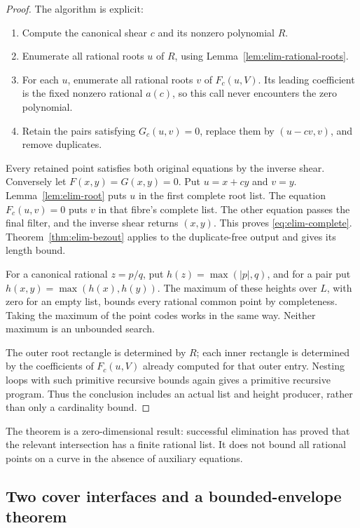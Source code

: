 \begin{proof}
The algorithm is explicit:
\begin{enumerate}
\item Compute the canonical shear \(c\) and its nonzero polynomial \(R\).
\item Enumerate all rational roots \(u\) of \(R\), using
Lemma~\ref{lem:elim-rational-roots}.
\item For each \(u\), enumerate all rational roots \(v\) of
\(F_c(u,V)\).  Its leading coefficient is the fixed nonzero rational
\(a(c)\), so this call never encounters the zero polynomial.
\item Retain the pairs satisfying \(G_c(u,v)=0\), replace them by
\((u-cv,v)\), and remove duplicates.
\end{enumerate}
Every retained point satisfies both original equations by the inverse
shear.  Conversely let \(F(x,y)=G(x,y)=0\).  Put \(u=x+cy\) and
\(v=y\).  Lemma~\ref{lem:elim-root} puts \(u\) in the first complete
root list.  The equation \(F_c(u,v)=0\) puts \(v\) in that fibre's
complete list.  The other equation passes the final filter, and the
inverse shear returns \((x,y)\).  This proves
\eqref{eq:elim-complete}.  Theorem~\ref{thm:elim-bezout} applies to the
duplicate-free output and gives its length bound.

For a canonical rational \(z=p/q\), put \(h(z)=\max(|p|,q)\), and
for a pair put \(h(x,y)=\max(h(x),h(y))\).  The maximum of these heights
over \(L\), with zero for an empty list, bounds every rational common
point by completeness.  Taking the maximum of the point codes works in
the same way.  Neither maximum is an unbounded search.

The outer root rectangle is determined by \(R\); each inner rectangle
is determined by the coefficients of \(F_c(u,V)\) already computed for
that outer entry.  Nesting loops with such primitive recursive bounds
again gives a primitive recursive program.  Thus the conclusion includes
an actual list and height producer, rather than only a cardinality bound.
\end{proof}

The theorem is a zero-dimensional result: successful elimination has
proved that the relevant intersection has a finite rational list.  It
does not bound all rational points on a curve in the absence of auxiliary
equations.

\subsection{Two cover interfaces and a bounded-envelope theorem}

